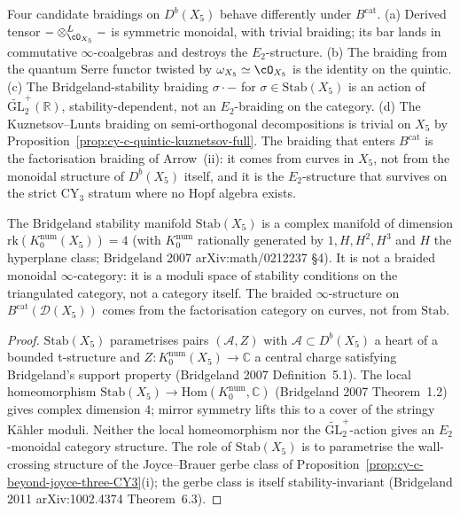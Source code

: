 \begin{remark}
\label{rem:cy-c-quintic-bcat-braiding-choice}
Four candidate braidings on $D^b(X_5)$ behave differently under
$B^{\mathrm{cat}}$. \textup{(a)} Derived tensor
$- \otimes^L_{\cO_{X_5}} -$ is symmetric monoidal, with trivial
braiding; its bar lands in commutative $\infty$-coalgebras and destroys
the $E_2$-structure. \textup{(b)} The braiding from the quantum Serre
functor twisted by $\omega_{X_5} \simeq \cO_{X_5}$ is the identity on
the quintic. \textup{(c)} The Bridgeland-stability braiding
$\sigma \cdot -$ for $\sigma \in \mathrm{Stab}(X_5)$ is an action of
$\widetilde{\mathrm{GL}}_2^+(\mathbb R)$, stability-dependent, not an
$E_2$-braiding on the category. \textup{(d)} The Kuznetsov--Lunts
braiding on semi-orthogonal decompositions is trivial on $X_5$ by
Proposition~\ref{prop:cy-c-quintic-kuznetsov-full}. The braiding that
enters $B^{\mathrm{cat}}$ is the factorisation braiding of Arrow~(ii):
it comes from curves in $X_5$, not from the monoidal structure of
$D^b(X_5)$ itself, and it is the $E_2$-structure that survives on the
strict CY$_3$ stratum where no Hopf algebra exists.
\end{remark}

\begin{proposition}
\label{prop:cy-c-quintic-stab-not-braided}
The Bridgeland stability manifold $\mathrm{Stab}(X_5)$ is a complex
manifold of dimension $\mathrm{rk}(K_0^{\mathrm{num}}(X_5)) = 4$
(with $K_0^{\mathrm{num}}$ rationally generated by $1, H, H^2, H^3$
and $H$ the hyperplane class; Bridgeland 2007 arXiv:math/0212237 \S 4).
It is not a braided monoidal $\infty$-category: it is a moduli space
of stability conditions on the triangulated category, not a category
itself. The braided $\infty$-structure on
$B^{\mathrm{cat}}(\mathcal D(X_5))$ comes from the factorisation
category on curves, not from $\mathrm{Stab}$.
\end{proposition}

\begin{proof}
$\mathrm{Stab}(X_5)$ parametrises pairs $(\mathcal A, Z)$ with
$\mathcal A \subset D^b(X_5)$ a heart of a bounded t-structure and
$Z : K_0^{\mathrm{num}}(X_5) \to \mathbb C$ a central charge
satisfying Bridgeland's support property (Bridgeland 2007
Definition~5.1). The local homeomorphism
$\mathrm{Stab}(X_5) \to \mathrm{Hom}(K_0^{\mathrm{num}}, \mathbb C)$
(Bridgeland 2007 Theorem~1.2) gives complex dimension $4$; mirror
symmetry lifts this to a cover of the stringy K\"ahler moduli. Neither
the local homeomorphism nor the $\widetilde{\mathrm{GL}}_2^+$-action
gives an $E_2$-monoidal category structure. The role of
$\mathrm{Stab}(X_5)$ is to parametrise the wall-crossing structure of
the Joyce--Brauer gerbe class of
Proposition~\ref{prop:cy-c-beyond-joyce-three-CY3}(i); the gerbe class
is itself stability-invariant (Bridgeland 2011 arXiv:1002.4374
Theorem~6.3).
\end{proof}


